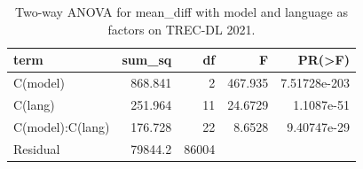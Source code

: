 \begin{table}
\caption{Two-way ANOVA for mean_diff with model and language as factors on TREC-DL 2021.}
\label{tab:anova_language_model_mean_diff_2021}
\begin{tabular}{l r r r r}
\toprule
term & sum_sq & df & F & PR(>F) \\
\midrule
C(model) & 868.841 & 2 & 467.935 & 7.51728e-203 \\
C(lang) & 251.964 & 11 & 24.6729 & 1.1087e-51 \\
C(model):C(lang) & 176.728 & 22 & 8.6528 & 9.40747e-29 \\
Residual & 79844.2 & 86004 &  &  \\
\bottomrule
\end{tabular}
\end{table}

